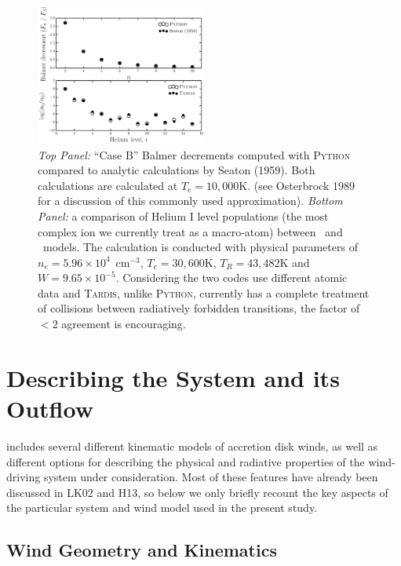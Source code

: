 \documentclass[preprint, a4paper, 11pt]{aastex}
\begin{document}
\begin{figure}
\centering
\includegraphics[width=0.5\textwidth]{figures/fig_caseb_tardis.eps}
\caption{
{\sl Top Panel:} ``Case B'' Balmer decrements computed 
with \textsc{Python} compared to analytic calculations
by Seaton (1959). Both calculations are calculated at $T_e=10,000$K.
(see Osterbrock 1989 for a discussion of this commonly used approximation).
{\sl Bottom Panel:}  a comparison of Helium I level populations (the most complex ion we currently 
treat as a macro-atom) between \py~and \tar~models. 
The calculation is conducted with physical parameters of $n_e=5.96\times10^4$~cm$^{-3}$,
$T_e=30,600$K, $T_R=43,482$K and $W=9.65\times10^{-5}$. 
Considering the two codes use different atomic data and \textsc{Tardis,} unlike \textsc{Python,} currently has a complete treatment of collisions between 
radiatively forbidden transitions, the factor of 
$<2$ agreement is encouraging. 
}
\label{tests}
\end{figure}


\nocite{osterbrock}
\nocite{seaton1959}

%
%

\section{Describing the System and its Outflow}

\py includes several different kinematic models of accretion disk
winds, as well as different options for describing the physical and
radiative properties of the wind-driving system under
consideration. Most of these features have already been discussed in
LK02 and H13, so below we only briefly recount the key aspects of the
particular system and wind model used in the present study.

\subsection{Wind Geometry and Kinematics}
\label{kinematics}
\end{document}
